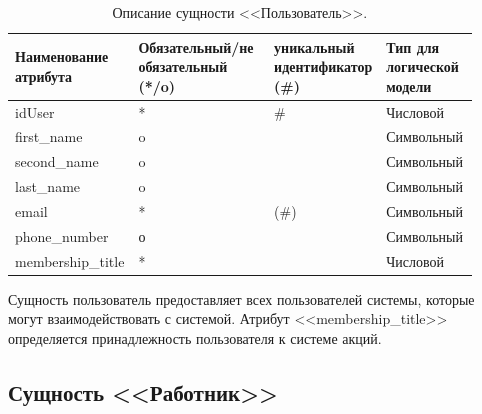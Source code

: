 \documentclass[14pt]{extreport}
\begin{document}
            \begin{table}[H]
                \begin{tabular}{|p{0.225\linewidth}|p{0.3\linewidth}|p{0.2\linewidth}|p{0.2\linewidth}|}
                    \hline
                    Наименование атрибута & Обязательный/не обязательный (*/o) & уникальный идентификатор (\#) & Тип для логической модели
                    \\ \hline
                    idUser & * & \# & Числовой \\ \hline
                    first\_name & o & & Символьный\\ \hline
                    second\_name & o & & Символьный\\ \hline
                    last\_name & o & & Символьный \\ \hline
                    email & * & (\#) & Символьный  \\ \hline
                    phone\_number & о & & Символьный\\ \hline
                    membership\_title & * & & Числовой \\ \hline
                \end{tabular}

                \caption{Описание сущности <<Пользователь>>.}
            \end{table}
        
        Сущность пользователь предоставляет всех пользователей системы,%
         которые могут взаимодействовать с системой. Атрибут <<membership\_title>> %
          определяется принадлежность пользователя к системе акций.
    
        \subsection*{Сущность <<Работник>>}
\end{document}
